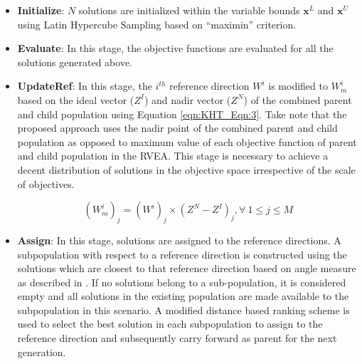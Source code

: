 \documentclass{sig-alternate}
\begin{document}
\begin{itemize}
	\item \textbf{Initialize}: $N$ solutions are initialized within the variable bounds $\textbf{x}^{L}$ and $\textbf{x}^{U}$ using Latin Hypercube Sampling based on ``maximin'' criterion.
	
	\item \textbf{Evaluate}: In this stage, the objective functions are evaluated for all the solutions generated above.
	
	\item \textbf{UpdateRef}: In this stage, the $i^{th}$ reference direction $W^i$ is modified to $W^i_m$ based on the ideal vector ($Z^I$) and nadir vector ($Z^N$) of the combined parent and child population using Equation \ref{eqn:KHT_Eqn:3}. Take note that the proposed approach uses the nadir point of the combined parent and child population as opposed to maximum value of each objective function of parent and child population in the RVEA. This stage is necessary to achieve a decent distribution of solutions in the objective space irrespective of the scale of objectives.
	
	\begin{equation}
	(W^i_m)_j = (W^i)_j\times(Z^N - Z^I)_j, \forall~1\le j\le M
	\label{eqn:KHT_Eqn:3}
	\end{equation}
	
	
	\item \textbf{Assign}: In this stage, solutions are assigned to the reference directions. A subpopulation with respect to a reference direction is constructed using the solutions which are closest to that reference direction based on angle measure as described in \cite{Cheng2016many}. If no solutions belong to a sub-population, it is considered empty and all solutions in the existing population are made available to the subpopulation in this scenario. A modified distance based ranking scheme is used to select the best solution in each subpopulation to assign to the reference direction and subsequently carry forward as parent for the next generation.
	

\end{itemize}
\end{document}
